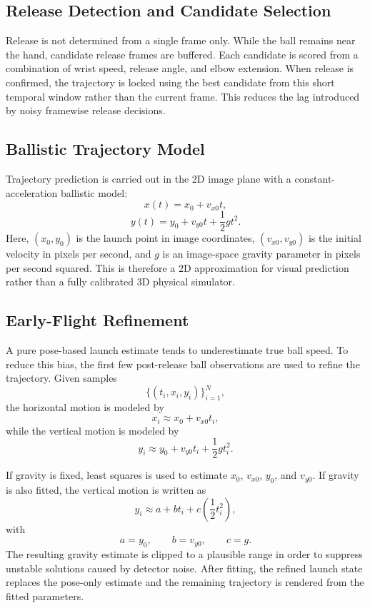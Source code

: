 \documentclass[11pt]{article}
\begin{document}
\subsection{Release Detection and Candidate Selection}
Release is not determined from a single frame only. While the ball remains near the hand, candidate release frames are buffered. Each candidate is scored from a combination of wrist speed, release angle, and elbow extension. When release is confirmed, the trajectory is locked using the best candidate from this short temporal window rather than the current frame. This reduces the lag introduced by noisy framewise release decisions.

\subsection{Ballistic Trajectory Model}
Trajectory prediction is carried out in the 2D image plane with a constant-acceleration ballistic model:
\begin{equation}
    x(t) = x_0 + v_{x0} t,
\end{equation}
\begin{equation}
    y(t) = y_0 + v_{y0} t + \frac{1}{2} g t^2.
\end{equation}
Here, $(x_0, y_0)$ is the launch point in image coordinates, $(v_{x0}, v_{y0})$ is the initial velocity in pixels per second, and $g$ is an image-space gravity parameter in pixels per second squared. This is therefore a 2D approximation for visual prediction rather than a fully calibrated 3D physical simulator.

\subsection{Early-Flight Refinement}
A pure pose-based launch estimate tends to underestimate true ball speed. To reduce this bias, the first few post-release ball observations are used to refine the trajectory. Given samples
\[
    \{(t_i, x_i, y_i)\}_{i=1}^{N},
\]
the horizontal motion is modeled by
\begin{equation}
    x_i \approx x_0 + v_{x0} t_i,
\end{equation}
while the vertical motion is modeled by
\begin{equation}
    y_i \approx y_0 + v_{y0} t_i + \frac{1}{2} g t_i^2.
\end{equation}

If gravity is fixed, least squares is used to estimate $x_0$, $v_{x0}$, $y_0$, and $v_{y0}$. If gravity is also fitted, the vertical motion is written as
\begin{equation}
    y_i \approx a + b t_i + c\left(\frac{1}{2} t_i^2\right),
\end{equation}
with
\[
    a = y_0, \qquad b = v_{y0}, \qquad c = g.
\]
The resulting gravity estimate is clipped to a plausible range in order to suppress unstable solutions caused by detector noise. After fitting, the refined launch state replaces the pose-only estimate and the remaining trajectory is rendered from the fitted parameters.
\end{document}
